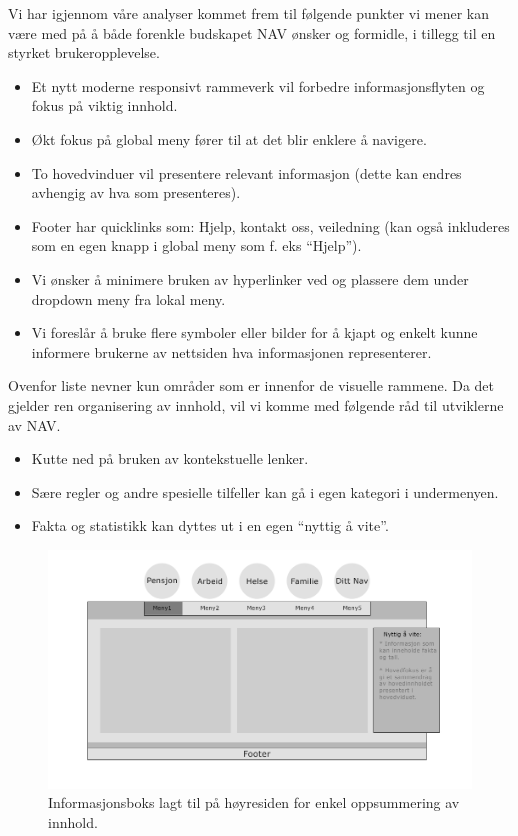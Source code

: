 \documentclass[informationsecurity]{gucmasterproject}
\begin{document}
 Vi har igjennom våre analyser kommet frem til følgende punkter vi mener kan være med på å både forenkle budskapet NAV ønsker og formidle, i tillegg til en styrket brukeropplevelse.

\begin{itemize}
\item Et nytt moderne responsivt rammeverk vil forbedre informasjonsflyten og fokus på viktig innhold.
\item Økt fokus på global meny fører til at det blir enklere å navigere.
\item To hovedvinduer vil presentere relevant informasjon (dette kan endres avhengig av hva som presenteres).
\item Footer har quicklinks som: Hjelp, kontakt oss, veiledning (kan også inkluderes som en egen knapp i global meny som f. eks “Hjelp”).
\item Vi ønsker å minimere bruken av hyperlinker ved og plassere dem under dropdown meny fra lokal meny.
\item Vi foreslår å bruke flere symboler eller bilder for å kjapt og enkelt kunne informere brukerne av nettsiden hva informasjonen representerer.
\end{itemize}
Ovenfor liste nevner kun områder som er innenfor de visuelle rammene. Da det gjelder ren organisering av innhold, vil vi komme med følgende råd til utviklerne av NAV.
\begin{itemize}
\item Kutte ned på bruken av kontekstuelle lenker.
\item Sære regler og andre spesielle tilfeller kan gå i egen kategori i undermenyen.
\item Fakta og statistikk kan dyttes ut i en egen “nyttig å vite”.
\end{itemize}

\begin{figure}[h!]
	\centering
	\includegraphics[width=40em]{Skisse_2}
	\caption{Informasjonsboks lagt til på høyresiden for enkel oppsummering av innhold.}
	\label{fig:skisse2}
\end{figure}
\end{document}

